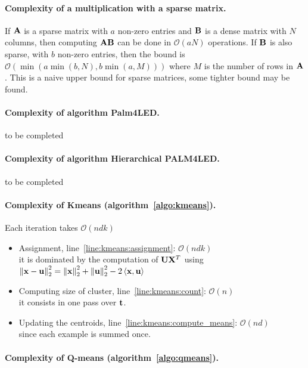 \documentclass{article}
\begin{document}
\paragraph{Complexity of a multiplication with a sparse matrix.}
If ${\mathbf{A}}$ is a sparse matrix with $a$ non-zero entries and ${\mathbf{B}}$ is a dense matrix with $N$ columns, then computing ${\mathbf{A}} {\mathbf{B}}$ can be done in $\mathcal{O}\left (aN\right )$ operations.
If ${\mathbf{B}}$ is also sparse, with $b$ non-zero entries, then the bound is $\mathcal{O}\left ( \min\left ( a \min\left (b, N \right ), b \min\left (a, M\right ) \right ) \right )$ where $M$ is the number of rows in ${\mathbf{A}}$.
This is a naive upper bound for sparse matrices, some tighter bound may be found.

\paragraph{Complexity of algorithm Palm4LED.}
to be completed

\paragraph{Complexity of algorithm Hierarchical PALM4LED.}
to be completed

\paragraph{Complexity of Kmeans (algorithm~\ref{algo:kmeans}).}
Each iteration takes $\mathcal{O}\left (ndk\right )$
\begin{itemize}
\item Assignment, line~\ref{line:kmeans:assignment}: $\mathcal{O}\left (ndk\right )$\\
it is dominated by the computation of ${\mathbf{U}} {\mathbf{X}}^T$ using $\left \|{\mathbf{x}}-{\mathbf{u}}\right \|_2^2=\left \|{\mathbf{x}}\right \|_2^2+\left \|{\mathbf{u}}\right \|_2^2-2\left <{\mathbf{x}}, {\mathbf{u}}\right >$
\item Computing size of cluster, line~\ref{line:kmeans:count}: $\mathcal{O}\left (n \right )$\\
it consists in one pass over ${\mathbf{t}}$.
\item Updating the centroids, line~\ref{line:kmeans:compute_means}: $\mathcal{O}\left (nd\right )$\\
since each example is summed once.
\end{itemize}

\paragraph{Complexity of Q-means (algorithm~\ref{algo:qmeans}).}
\end{document}
